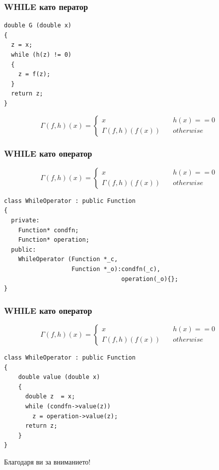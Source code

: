 \documentclass{beamer}
\begin{document}
\begin{frame}[fragile]
\frametitle{WHILE като ператор}

\begin{center}

\begin{lstlisting}
double G (double x)
{
  z = x;
  while (h(z) != 0)
  {
    z = f(z);
  }
  return z;
}
\end{lstlisting}

\end{center}


$$
\Gamma(f,h)(x) = \left\{
        \begin{array}{ll}
            x & \quad h(x) == 0 \\
            \Gamma(f,h)(f(x)) & \quad otherwise
        \end{array}
    \right.
$$



\end{frame}


\begin{frame}[fragile]
\frametitle{WHILE като оператор}

\begin{center}
$$
\Gamma(f,h)(x) = \left\{
        \begin{array}{ll}
            x & \quad h(x) == 0 \\
            \Gamma(f,h)(f(x)) & \quad otherwise
        \end{array}
    \right.
$$


\begin{lstlisting}
class WhileOperator : public Function
{
  private:
    Function* condfn;
    Function* operation;
  public:
    WhileOperator (Function *_c,
                   Function *_o):condfn(_c),
                                 operation(_o){};
}
\end{lstlisting}

\end{center}


\end{frame}



\begin{frame}[fragile]
\frametitle{WHILE като оператор}

\begin{center}

$$
\Gamma(f,h)(x) = \left\{
        \begin{array}{ll}
            x & \quad h(x) == 0 \\
            \Gamma(f,h)(f(x)) & \quad otherwise
        \end{array}
    \right.
$$


\begin{lstlisting}
class WhileOperator : public Function
{
    double value (double x)
    {
      double z  = x;
      while (condfn->value(z))
        z = operation->value(z);
      return z;
    }
}
\end{lstlisting}

\end{center}


\end{frame}


\begin{frame}
\centerline{Благодаря ви за вниманието!}
\end{frame}
\end{document}
